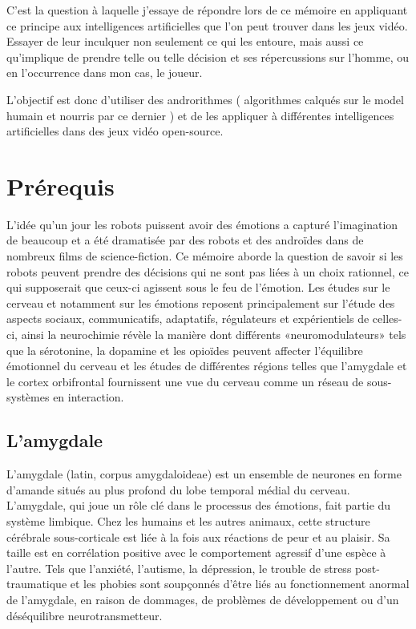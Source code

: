 C'est la question à laquelle j'essaye de répondre lors de ce mémoire en appliquant ce principe aux intelligences artificielles que l'on peut trouver dans les jeux vidéo. Essayer de leur inculquer non seulement ce qui les entoure, mais aussi ce qu'implique de prendre telle ou telle décision et ses répercussions sur l'homme, ou en l'occurrence dans mon cas, le joueur.

L'objectif est donc d'utiliser des androrithmes \parencite{humanityvstechnology} ( algorithmes calqués sur le model humain et nourris par ce dernier ) et de les appliquer à différentes intelligences artificielles dans des jeux vidéo open-source. 



\section{Prérequis}

L'idée qu'un jour les robots puissent avoir des émotions a capturé l'imagination de beaucoup et a été dramatisée par des robots et des androïdes dans de nombreux films de science-fiction. Ce mémoire aborde la question de savoir si les robots peuvent prendre des décisions qui ne sont pas liées à un choix rationnel, ce qui supposerait que ceux-ci agissent sous le feu de l’émotion. Les études sur le cerveau et notamment sur  les émotions reposent principalement sur l’étude des aspects sociaux, communicatifs, adaptatifs, régulateurs et expérientiels de celles-ci, ainsi la neurochimie révèle la manière dont différents «neuromodulateurs» tels que la sérotonine, la dopamine et les opioïdes peuvent affecter l’équilibre émotionnel du cerveau et les études de différentes régions telles que l'amygdale et le cortex orbifrontal fournissent une vue du cerveau comme un réseau de sous-systèmes en interaction. \parencite{whoneedsemotions}



\subsection{ L'amygdale}

L'amygdale (latin, corpus amygdaloideae) est un ensemble de neurones en forme d'amande situés au plus profond du lobe temporal médial du cerveau.
L'amygdale, qui joue un rôle clé dans le processus des émotions, fait partie du système limbique.
Chez les humains et les autres animaux, cette structure cérébrale sous-corticale est liée à la fois aux réactions de peur et au plaisir.
Sa taille est en corrélation positive avec le comportement agressif d'une espèce à l'autre.
Tels que l'anxiété, l'autisme, la dépression, le trouble de stress post-traumatique et les phobies sont soupçonnés d'être liés au fonctionnement anormal de l'amygdale, en raison de dommages, de problèmes de développement ou d'un déséquilibre neurotransmetteur.

